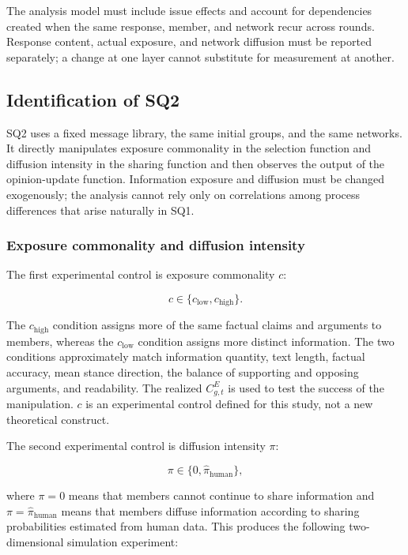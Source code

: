 \documentclass[11pt,a4paper]{article}
\begin{document}
The analysis model must include issue effects and account for dependencies created when the same response, member, and network recur across rounds. Response content, actual exposure, and network diffusion must be reported separately; a change at one layer cannot substitute for measurement at another.

\subsection{Identification of SQ2}

SQ2 uses a fixed message library, the same initial groups, and the same networks. It directly manipulates exposure commonality in the selection function and diffusion intensity in the sharing function and then observes the output of the opinion-update function. Information exposure and diffusion must be changed exogenously; the analysis cannot rely only on correlations among process differences that arise naturally in SQ1.

\subsubsection{Exposure commonality and diffusion intensity}

The first experimental control is exposure commonality $c$:

\begin{equation*}
c\in\{c_{\text{low}},c_{\text{high}}\}.
\end{equation*}

The $c_{\text{high}}$ condition assigns more of the same factual claims and arguments to members, whereas the $c_{\text{low}}$ condition assigns more distinct information. The two conditions approximately match information quantity, text length, factual accuracy, mean stance direction, the balance of supporting and opposing arguments, and readability. The realized $C^{E}_{g,t}$ is used to test the success of the manipulation. $c$ is an experimental control defined for this study, not a new theoretical construct.

The second experimental control is diffusion intensity $\pi$:

\begin{equation*}
\pi\in\{0,\hat\pi_{\text{human}}\},
\end{equation*}

where $\pi=0$ means that members cannot continue to share information and $\pi=\hat\pi_{\text{human}}$ means that members diffuse information according to sharing probabilities estimated from human data. This produces the following two-dimensional simulation experiment:
\end{document}
